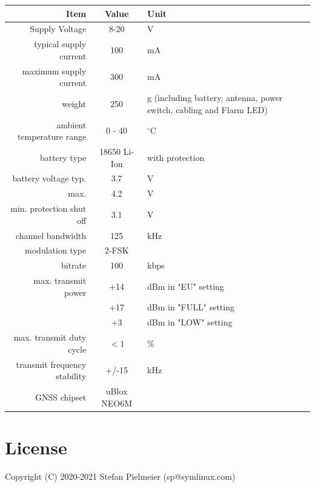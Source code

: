 \documentclass[11pt,a4paper]{article}
\begin{document}
\begin{tabular}{r|c|p{6cm}}\hline
Item & Value & Unit\\\hline\hline
Supply Voltage & 8-20 & V\\\hline
typical supply current & 100 & mA\\\hline
maximum supply current & 300 & mA  \\\hline
weight & 250 & g (including battery, antenna, power switch, cabling and Flarm LED)\\\hline
ambient temperature range & 0 - 40 & $^\circ$C \\\hline
battery type & 18650 Li-Ion & with protection\\
battery voltage typ. & 3.7 & V\\
max. & 4.2 & V\\
min. protection shut off & 3.1 & V\\\hline
channel bandwidth & 125 & kHz\\
modulation type & 2-FSK & \\
bitrate & 100 & kbps\\
max. transmit power & +14 & dBm in "EU" setting\\
 & +17 & dBm in "FULL" setting\\
 & +3 & dBm in "LOW" setting\\
max. transmit duty cycle & $< 1$ & \%\\
transmit frequency stability & +/-15 & kHz\\\hline
GNSS chipset & uBlox NEO6M & \\\hline

\end{tabular}

\section{License}
Copyright (C)  2020-2021 Stefan Pielmeier (sp@symlinux.com)\\

\begin{center}
\end{center}    
\end{document}
